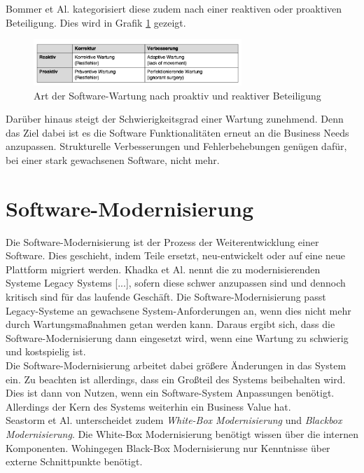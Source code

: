 Bommer et Al. \cite{bommer_softwarewartung_2016} kategorisiert diese zudem nach einer reaktiven oder proaktiven Beteiligung. Dies wird in Grafik \ref{fig:proactive} gezeigt. 
\begin{figure}[bth] 
  \centering
  \includegraphics[width=0.7\textwidth]{Chapters/3-Die-Software-Entwicklung/images/KindsOfCorrection.png}
  \caption{Art der Software-Wartung nach proaktiv und reaktiver Beteiligung \cite{bommer_softwarewartung_2016}}
  \label{fig:proactive}
\end{figure}
Darüber hinaus steigt der Schwierigkeitsgrad einer Wartung zunehmend. Denn das Ziel dabei ist es die Software Funktionalitäten erneut an die Business Needs anzupassen. Strukturelle Verbesserungen und Fehlerbehebungen genügen dafür, bei einer stark gewachsenen Software, nicht mehr.

\section{Software-Modernisierung}
Die Software-Modernisierung ist der Prozess der Weiterentwicklung einer Software. Dies geschieht, indem Teile ersetzt, neu-entwickelt oder auf eine neue Plattform migriert werden. \cite{khadka_does_2015}
Khadka et Al. \cite{ravi_khadka_how_nodate} nennt die zu modernisierenden Systeme \glqq[...] Legacy Systems [...]\grqq{}, sofern diese schwer anzupassen sind und dennoch kritisch sind für das laufende Geschäft. Die Software-Modernisierung passt Legacy-Systeme an gewachsene System-Anforderungen an, wenn dies nicht mehr durch Wartungsmaßnahmen getan werden kann. Daraus ergibt sich, dass die Software-Modernisierung dann eingesetzt wird, wenn eine Wartung zu schwierig und kostspielig ist. \\
Die Software-Modernisierung arbeitet dabei größere Änderungen in das System ein. Zu beachten ist allerdings, dass ein Großteil des Systems beibehalten wird. Dies ist dann von Nutzen, wenn ein Software-System Anpassungen benötigt. Allerdings der Kern des Systems weiterhin ein Business Value hat. \cite{seacord_modernizing_2003}\\
Seastorm et Al. \cite{seacord_modernizing_2003} unterscheidet zudem \textit{White-Box Modernisierung} und \textit{Blackbox Modernisierung}. Die White-Box Modernisierung benötigt wissen über die internen Komponenten.  Wohingegen Black-Box Modernisierung nur Kenntnisse über externe Schnittpunkte benötigt. 

